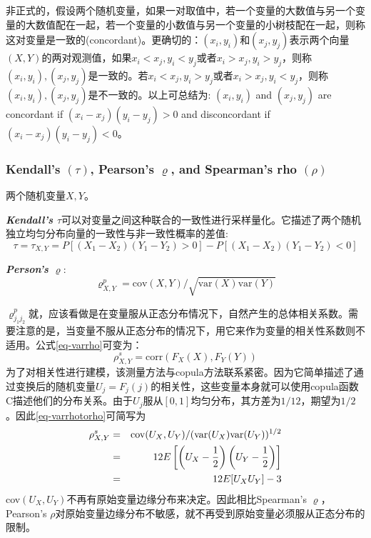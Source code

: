 非正式的，假设两个随机变量，如果一对取值中，若一个变量的大数值与另一个变量的大数值配在一起，若一个变量的小数值与另一个变量的小树枝配在一起，则称这对变量是一致的(concordant)。更确切的：$(x_i,y_i)$和$(x_j,y_j)$表示两个向量$(X,Y)$的两对观测值，如果$x_i<x_j,y_i<y_j$或者$x_i>x_j,y_i>y_j$，则称$(x_i,y_i),(x_j,y_j)$是一致的。若$x_i<x_j,y_i>y_j$或者$x_i>x_j,y_i<y_j$，则称$(x_i,y_i),(x_j,y_j)$是不一致的。以上可总结为:
$(x_i,y_i)$ and $(x_j,y_j)$ are concordant if $(x_i-x_j)(y_i-y_j)>0$ and disconcordant if $(x_i-x_j)(y_i-y_j)<0$。

\subsubsection{Kendall's $(\tau)$, Pearson's $\varrho$, and Spearman's rho $(\rho)$}
两个随机变量$X,Y$。

\emph{\textbf{\textcolor[rgb]{1,0,0}{Kendall's $\tau$}}}可以对变量之间这种联合的一致性进行采样量化。它描述了两个随机独立均匀分布向量的一致性与非一致性概率的差值\cite{Montes2015}:
\begin{equation}
    \tau = \tau_{X,Y} = P[(X_1-X_2)(Y_1-Y_2) > 0] - P[(X_1-X_2)(Y_1-Y_2)<0]
    \label{eq-tau}
\end{equation}

\emph{\textbf{\textcolor[rgb]{1,0,0}{Person's $\varrho$}}}:
\begin{equation}   
    \label{eq-varrho}
    \varrho^{p}_{X,Y} = \text{cov}(X,Y)/\sqrt{\text{var}(X)\text{var}(Y)}
\end{equation}


$\varrho_{j_1 j_2}^{p}$就，应该看做是在变量服从正态分布情况下，自然产生的总体相关系数。需要注意的是，当变量不服从正态分布的情况下，用它来作为变量的相关性系数则不适用\cite{Smith2009}。公式\ref{eq-varrho}可变为：
\begin{equation}
    \rho_{X,Y}^s = \text{corr}(F_{X}(X),F_{Y}(Y))
    \label{eq-varrhotorho}
\end{equation}
为了对相关性进行建模，该测量方法与copula方法联系紧密。因为它简单描述了通过变换后的随机变量$U_j = F_j(j)$的相关性，这些变量本身就可以使用copula函数C描述他们的分布关系。\textcolor[rgb]{1,0,0}{由于$U_j$服从$[0,1]$均匀分布}，其方差为$1/12$，期望为$1/2$。因此\cref{eq-varrhotorho}可简写为
\begin{eqnarray}
    \rho_{X,Y}^s &=& \text{cov}(U_{X},U_{Y})/(\text{var}(U_{X})\text{var}(U_{Y}))^{1/2} \notag \\
    &=& 12E \left[ \left(U_{X} - \dfrac{1}{2}\right)\left(U_{Y} - \dfrac{1}{2}\right) \right] \notag \\
    &=& 12E [U_{X}U_{Y}] -3
    \label{eq-rhoSimplified}
\end{eqnarray}
cov$(U_X,U_Y)$不再有原始变量边缘分布来决定。因此相比Spearman's $\varrho$，Pearson's $\rho$对原始变量边缘分布不敏感，就不再受到原始变量必须服从正态分布的限制。



